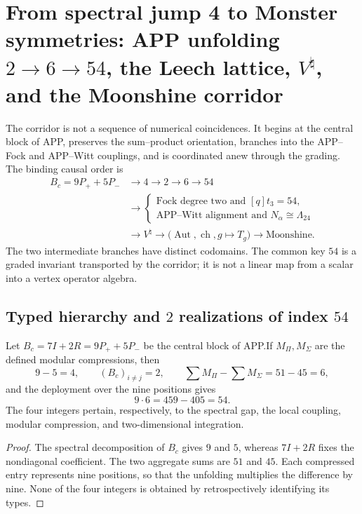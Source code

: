 \section{From spectral jump 4 to Monster symmetries: APP unfolding
\texorpdfstring{$2\to6\to54$}{2--6--54}, the Leech lattice,
\texorpdfstring{$V^\natural$}{V natural}, and the Moonshine corridor}
\label{sec:cierre-equivalencias-corredor-moonshine-20260825}

The corridor is not a sequence of numerical coincidences. It begins at the
central block of APP, preserves the sum--product orientation, branches into the
APP--Fock and APP--Witt couplings, and is coordinated anew through the
grading. The binding causal order is
\[\begin{aligned}
 B_c=9P_++5P_-
 &\longrightarrow 4\longrightarrow2\longrightarrow6\longrightarrow54\\
 &\longrightarrow
 \left\{
 \begin{array}{l}
  \text{Fock degree two and }[q]t_3=54,\\
  \text{APP--Witt alignment and }N_\alpha\cong\Lambda_{24}
 \end{array}
 \right.\\
 &\longrightarrow V^\natural
 \longrightarrow
 \bigl(\operatorname{Aut},\operatorname{ch},g\mapsto T_g\bigr)
 \longrightarrow\text{Moonshine}.
\end{aligned}\]
The two intermediate branches have distinct codomains. The common key \(54\)
is a graded invariant transported by the corridor; it is not a
linear map from a scalar into a vertex operator algebra.

\subsection{Typed hierarchy and \(2\) realizations of index \(54\)}

\begin{theorem}
\label{thm:cierre-vtm-jerarquia-app}
Let \(B_c=7I+2R=9P_++5P_-\) be the central block of APP.\@ If
\(M_\Pi,M_\Sigma\) are the defined modular compressions, then
\[
 9-5=4,
 \qquad (B_c)_{i\ne j}=2,
 \qquad \sum M_\Pi-\sum M_\Sigma=51-45=6,
\]
and the deployment over the nine positions gives
\[
 9\cdot6=459-405=54.
\]
The four integers pertain, respectively, to the spectral gap, the
local coupling, modular compression, and two-dimensional integration.
\end{theorem}

\begin{proof}
The spectral decomposition of \(B_c\) gives \(9\) and \(5\), whereas
\(7I+2R\) fixes the nondiagonal coefficient. The two aggregate sums are \(51\)
and \(45\). Each compressed entry represents nine positions, so that the
unfolding multiplies the difference by nine. None of the four integers
is obtained by retrospectively identifying its types.
\end{proof}

